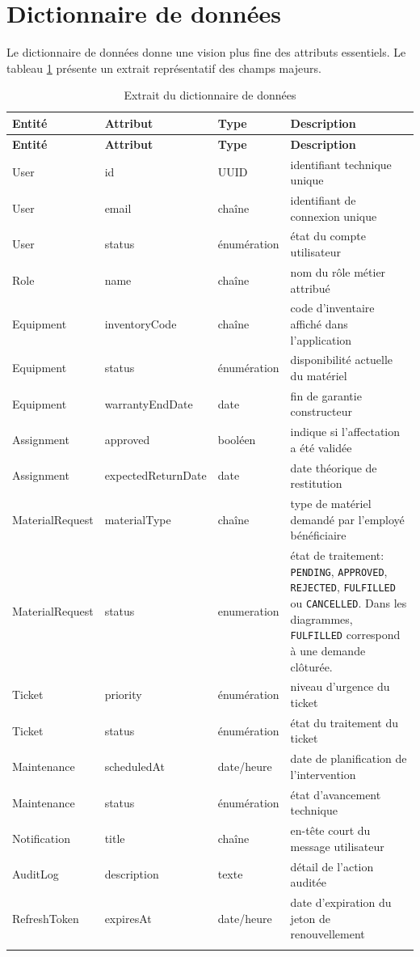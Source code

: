 \section{Dictionnaire de données}
Le dictionnaire de données donne une vision plus fine des attributs essentiels. Le tableau \ref{tab:data-dictionary} présente un extrait représentatif des champs majeurs.

\begin{longtable}{p{2.6cm}p{3.2cm}p{2.5cm}p{6.2cm}}
\caption{Extrait du dictionnaire de données}\\
\toprule
\textbf{Entité} & \textbf{Attribut} & \textbf{Type} & \textbf{Description} \\
\midrule
\endfirsthead
\toprule
\textbf{Entité} & \textbf{Attribut} & \textbf{Type} & \textbf{Description} \\
\midrule
\endhead
User & id & UUID & identifiant technique unique \\
User & email & chaîne & identifiant de connexion unique \\
User & status & énumération & état du compte utilisateur \\
Role & name & chaîne & nom du rôle métier attribué \\
Equipment & inventoryCode & chaîne & code d'inventaire affiché dans l'application \\
Equipment & status & énumération & disponibilité actuelle du matériel \\
Equipment & warrantyEndDate & date & fin de garantie constructeur \\
Assignment & approved & booléen & indique si l'affectation a été validée \\
Assignment & expectedReturnDate & date & date théorique de restitution \\
MaterialRequest & materialType & chaîne & type de matériel demandé par l'employé bénéficiaire \\
MaterialRequest & status & enumeration & état de traitement: \texttt{PENDING}, \texttt{APPROVED}, \texttt{REJECTED}, \texttt{FULFILLED} ou \texttt{CANCELLED}. Dans les diagrammes, \texttt{FULFILLED} correspond à une demande clôturée. \\
Ticket & priority & énumération & niveau d'urgence du ticket \\
Ticket & status & énumération & état du traitement du ticket \\
Maintenance & scheduledAt & date/heure & date de planification de l'intervention \\
Maintenance & status & énumération & état d'avancement technique \\
Notification & title & chaîne & en-tête court du message utilisateur \\
AuditLog & description & texte & détail de l'action auditée \\
RefreshToken & expiresAt & date/heure & date d'expiration du jeton de renouvellement \\
\bottomrule
\label{tab:data-dictionary}
\end{longtable}

